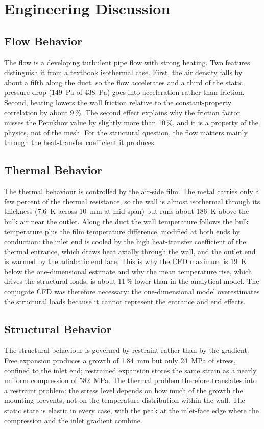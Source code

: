 \chapter{Engineering Discussion}\label{ch:discussion}

\section{Flow Behavior}
The flow is a developing turbulent pipe flow with strong heating. Two features distinguish it from a textbook isothermal case. First, the
air density falls by about a fifth along the duct, so the flow accelerates and a third of the static pressure drop (149~Pa of 438~Pa) goes into
acceleration rather than friction. Second, heating lowers the wall friction relative to the constant-property correlation by about 9\,\%. The
second effect explains why the friction factor misses the Petukhov value by slightly more than 10\,\%, and it is a property of the physics, not
of the mesh. For the structural question, the flow matters mainly through the heat-transfer coefficient it produces.

\section{Thermal Behavior}
The thermal behaviour is controlled by the air-side film. The metal carries only a few percent of the thermal resistance, so the wall is
almost isothermal through its thickness (7.6~K across 10~mm at mid-span) but runs about 186~K above the bulk air near the outlet. Along the duct
the wall temperature follows the bulk temperature plus the film temperature difference, modified at both ends by conduction: the inlet end is
cooled by the high heat-transfer coefficient of the thermal entrance, which draws heat axially through the wall, and the outlet end is
warmed by the adiabatic end face. This is why the CFD maximum is 19~K below the one-dimensional estimate and why the mean temperature rise, which
drives the structural loads, is about 11\,\% lower than in the analytical model. The conjugate CFD was therefore necessary: the one-dimensional
model overestimates the structural loads because it cannot represent the entrance and end effects.

\section{Structural Behavior}
The structural behaviour is governed by restraint rather than by the gradient. Free expansion produces a growth of 1.84~mm but only 24~MPa of
stress, confined to the inlet end; restrained expansion stores the same strain as a nearly uniform compression of 582~MPa. The thermal
problem therefore translates into a restraint problem: the stress level depends on how much of the growth the mounting prevents, not on
the temperature distribution within the wall. The static state is elastic in every case, with the peak at the inlet-face edge where the
compression and the inlet gradient combine.

